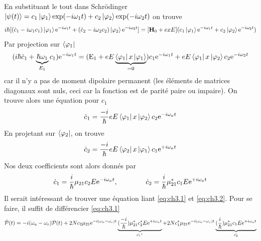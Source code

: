 En substituant le tout dans Schrödinger 
$\left| {\psi (t)} \right\rangle  = {c_1}\left| {{\varphi _1}} \right\rangle {\rm{exp( - }}i{\omega _1}t{\rm{)}} + {c_2}\left| {{\varphi _2}} \right\rangle {\rm{exp( - }}i{\omega _2}t{\rm{)}}$ on 
trouve
\begin{equation}
i\hbar [({{\dot c}_1} - i{\omega _1}{c_1})\left| {{\varphi _1}} \right\rangle {{\rm{e}}^{ - i{\omega _1}t}} + ({{\dot c}_2} - i{\omega _2}{c_2})\left| {{\varphi _2}} \right\rangle {{\rm{e}}^{ - i{\omega _2}t}}]  = [{\mathbf{H}_0} + exE]({c_1}\left| {{\varphi _1}} \right\rangle {{\rm{e}}^{ - i{\omega _1}t}} + {c_2}\left| {{\varphi _2}} \right\rangle {{\rm{e}}^{ - i{\omega _2}t}})
\end{equation}
Par projection sur $\bra{\varphi_1}$
\begin{equation}
(i\hbar {\dot c_1} + \underbrace{\hbar {\omega _1}}_{E_1}{c_1}){{\rm{e}}^{ - i{\omega _1}t}} = ({{\rm{E}}_1} + eE\underbrace{\left\langle {{\varphi _1}} \right|x\left| {{\varphi _1}} \right\rangle }_{=0} ){c_1}{{\rm{e}}^{ - i{\omega _1}t}} + eE\left\langle {{\varphi _1}} \right|x\left| {{\varphi _2}} \right\rangle {c_2}{{\rm{e}}^{ - i{\omega _2}t}}
\end{equation}
car il n'y a pas de moment dipolaire permanent (les éléments de matrices diagonaux sont nuls, ceci 
car la fonction est de parité paire ou impaire). On trouve alors une équation pour $c_1$
\begin{equation}
{\dot c_1} = \frac{{ - i}}{\hbar }eE\left\langle {{\varphi _1}} \right|x\left| {{\varphi _2}} \right\rangle {c_2}{{\rm{e}}^{ - i{\omega _a}t}}
\end{equation}
En projetant sur $\bra{\varphi_2}$, on trouve
\begin{equation}
{\dot c_2} = \frac{{ - i}}{\hbar }eE\left\langle {{\varphi _2}} \right|x\left| {{\varphi _1}} \right\rangle {c_1}{{\rm{e}}^{ + i{\omega _a}t}}
\end{equation}
Nos deux coefficients sont alors donnés par
\begin{equation}
{\dot c_1} = \frac{i}{\hbar }{\mu _{21}}{c_2}E{{\rm{e}}^{ - i{\omega _a}t}},\qquad\qquad
{\dot c_2} = \frac{i}{\hbar }\mu _{21}^*{c_1}E{{\rm{e}}^{ + i{\omega _a}t}}
\label{eq:ch3.2}
\end{equation}
Il serait intéressant de trouver une équation liant \eqref{eq:ch3.1} et \eqref{eq:ch3.2}. Pour 
se faire, il suffit de différencier \eqref{eq:ch3.1}
\begin{equation}
\dot {\cal P}(t) =  - i({\omega _a} - {\omega _c}){\cal P}(t) + 2N{c_2}{\mu _{21}}{{\rm{e}}^{ - i({\omega _a} - {\omega _c})t}}\underbrace{(\frac{{ - i}}{\hbar })\mu _{21}^*c_2^*E{{\rm{e}}^{ + i{\omega _a}t}}}_{\dot{c_1}^*} + 2Nc_1^*{\mu _{21}}{{\rm{e}}^{ - i({\omega _a} - {\omega _c})t}}\underbrace{(\frac{i}{\hbar })\mu _{21}^*{c_1}E{{\rm{e}}^{ + i{\omega _a}t}}}_{\dot{c_2}}
\end{equation}
